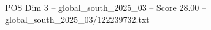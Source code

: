 \begin{textsample}{POS Dim 3 – global\_south\_2025\_03 – Score 28.00 – global\_south\_2025\_03/122239732.txt}
\end{textsample}
